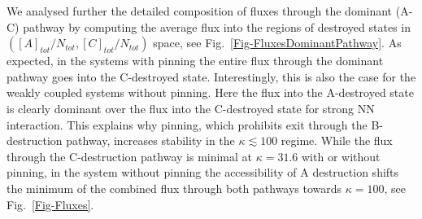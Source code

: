 \documentclass[10pt]{article}
\newcommand{\GA}{A\xspace}
\newcommand{\GB}{B\xspace}
\newcommand{\GC}{C\xspace}
\begin{document}
We analysed further the detailed composition of fluxes through the dominant (\GA-\GC) pathway 
by computing the average flux into the regions of destroyed states in $([\GA]_{tot}/N_{tot},[\GC]_{tot}/N_{tot})$ space, see Fig.~\ref{Fig-FluxesDominantPathway}.
As expected, in the systems with pinning the entire flux through the dominant pathway goes into the \GC-destroyed state.
Interestingly, this is also the case for the weakly coupled systems without pinning.
Here the flux into the \GA-destroyed state is clearly dominant over the flux into the \GC-destroyed state for strong NN interaction.
This explains why pinning, which prohibits exit through the \GB-destruction pathway, increases stability in the $\kappa \lesssim 100$ regime.
While the flux through the \GC-destruction pathway is minimal at $\kappa=31.6$ with or without pinning,
in the system without pinning the accessibility of \GA destruction shifts the minimum of the combined flux through both pathways
towards $\kappa=100$, see Fig.~\ref{Fig-Fluxes}.

\FloatBarrier
\end{document}
